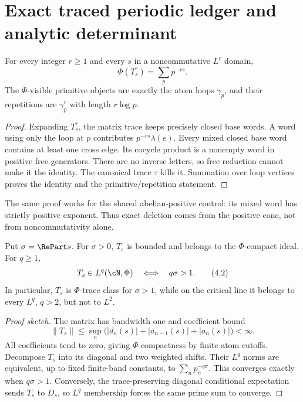 \section{Exact traced periodic ledger and analytic determinant}
\label{sec:tau-euler}

\begin{theorem}
\label{thm:ledger}
For every integer $r\ge1$ and every $s$ in a noncommutative $L^r$ domain,
\[
 \Phi(T_s^r)=\sum_pp^{-rs}.                  \tag{4.1}
\]
The $\Phi$-visible primitive objects are exactly the atom loops $\gamma_p$,
and their repetitions are $\gamma_p^r$ with length $r\log p$.
\end{theorem}

\begin{proof}
Expanding $T_s^r$, the matrix trace keeps precisely closed base words.  A
word using only the loop at $p$ contributes $p^{-rs}\lambda(e)$.  Every
mixed closed base word contains at least one cross edge.  Its cocycle product
is a nonempty word in positive free generators.  There are no inverse
letters, so free reduction cannot make it the identity.  The canonical trace
$\tau$ kills it.  Summation over loop vertices proves the identity and the
primitive/repetition statement.
\end{proof}

The same proof works for the shared abelian-positive control: its mixed word
has strictly positive exponent.  Thus exact deletion comes from the positive
cone, not from noncommutativity alone.

\begin{proposition}
\label{prop:ideals}
Put $\sigma=\RePart s$.  For $\sigma>0$, $T_s$ is bounded and belongs to the
$\Phi$-compact ideal.  For $q\ge1$,
\[
 T_s\in L^q(\cN,\Phi)\quad\Longleftrightarrow\quad q\sigma>1. \tag{4.2}
\]
In particular, $T_s$ is $\Phi$-trace class for $\sigma>1$, while on the
critical line it belongs to every $L^q$, $q>2$, but not to $L^2$.
\end{proposition}

\begin{proof}[Proof sketch]
The matrix has bandwidth one and coefficient bound
\[
 \|T_s\|\le\sup_n
 \bigl(|d_n(s)|+|a_{n-1}(s)|+|a_n(s)|\bigr)<\infty.
\]
All coefficients tend to zero, giving $\Phi$-compactness by finite atom
cutoffs.  Decompose $T_s$ into its diagonal and two weighted shifts.  Their
$L^q$ norms are equivalent, up to fixed finite-band constants, to
$\sum_np_n^{-q\sigma}$.  This converges exactly when $q\sigma>1$.  Conversely,
the trace-preserving diagonal conditional expectation sends $T_s$ to $D_s$,
so $L^q$ membership forces the same prime sum to converge.
\end{proof}

